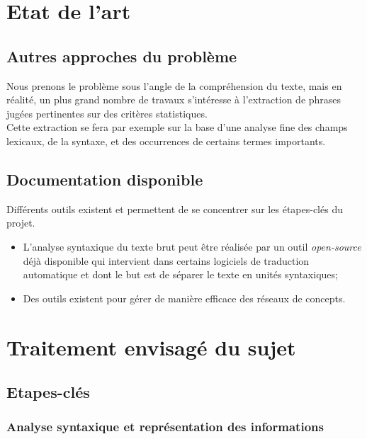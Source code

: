 \documentclass{article}           %
\begin{document}
\section{Etat de l'art}%

\subsection{Autres approches du problème}
Nous prenons le problème sous l'angle de la compréhension du texte, mais en réalité, un plus grand nombre de travaux s'intéresse à l'extraction de phrases jugées pertinentes sur des critères statistiques.\\
Cette extraction se fera par exemple sur la base d'une analyse fine des champs lexicaux, de la syntaxe, et des occurrences de certains termes importants.


\subsection{Documentation disponible}
Différents outils existent et permettent de se concentrer sur les étapes-clés du projet.\\
\begin{itemize}
 \item L'analyse syntaxique du texte brut peut être réalisée par un outil \textit{open-source} déjà disponible qui intervient dans certains logiciels de traduction automatique et dont le but est de séparer le texte en unités syntaxiques;
 \item Des outils existent pour gérer de manière efficace des réseaux de concepts.
\end{itemize}



\section{Traitement envisagé du sujet}

\subsection{Etapes-clés} %

\subsubsection{Analyse syntaxique et représentation des informations}
\end{document}
